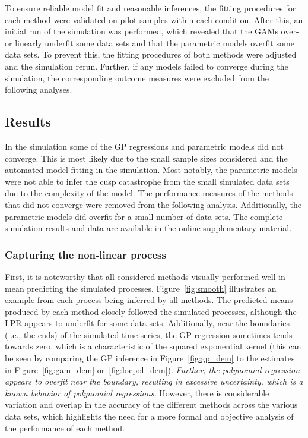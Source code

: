 \documentclass[man, floatsintext]{apa7}
\begin{document}
To ensure reliable model fit and reasonable inferences, the fitting procedures
for each method were validated on pilot samples within each condition. After
this, an initial run of the simulation was performed, which revealed that the
GAMs over- or linearly underfit some data sets and that the parametric models
overfit some data sets. To prevent this, the fitting procedures of both methods
were adjusted and the simulation rerun. Further, if any models failed to
converge during the simulation, the corresponding outcome measures were
excluded from the following analyses.

\subsection{Results}

In the simulation some of the GP regressions and parametric models did not
converge. This is most likely due to the small sample sizes considered and the
automated model fitting in the simulation. Most notably, the parametric models
were not able to infer the cusp catastrophe from the small simulated data sets
due to the complexity of the model. The performance measures of the methods
that did not converge were removed from the following analysis. Additionally,
the parametric models did overfit for a small number of data sets. The
complete simulation results and data are available in the online supplementary
material.

\subsubsection{Capturing the non-linear process}

First, it is noteworthy that all considered methods visually performed well in
mean predicting the simulated processes. Figure~\ref{fig:smooth} illustrates an
example from each process being inferred by all methods. The predicted means
produced by each method closely followed the simulated processes, although the
LPR appears to underfit for some data sets. Additionally, near the boundaries
(i.e., the ends) of the simulated time series, the GP regression sometimes
tends towards zero, which is a characteristic of the squared exponential kernel
(this can be seen by comparing the GP inference in Figure~\ref{fig:gp_dem} to
the estimates in Figure~\ref{fig:gam_dem} or~\ref{fig:locpol_dem}).
\textit{Further,
  the polynomial regression appears to overfit near the boundary, resulting in
  excessive uncertainty, which is a known behavior of polynomial regressions.}
However, there is considerable variation and overlap in the accuracy of the
different methods across the various data sets, which highlights the need for a
more formal and objective analysis of the performance of each method.
\end{document}
